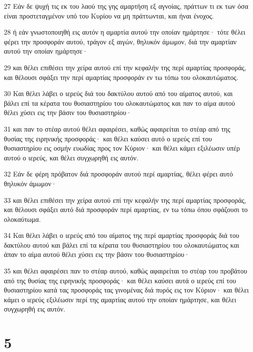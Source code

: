 \par 27 Εάν δε ψυχή τις εκ του λαού της γης αμαρτήση εξ αγνοίας, πράττων τι εκ των όσα είναι προστεταγμένον υπό του Κυρίου να μη πράττωνται, και ήναι ένοχος.
\par 28 ή εάν γνωστοποιηθή εις αυτόν η αμαρτία αυτού την οποίαν ημάρτησε· τότε θέλει φέρει την προσφοράν αυτού, τράγον εξ αιγών, θηλυκόν άμωμον, διά την αμαρτίαν αυτού την οποίαν ημάρτησε·
\par 29 και θέλει επιθέσει την χείρα αυτού επί την κεφαλήν της περί αμαρτίας προσφοράς, και θέλουσι σφάξει την περί αμαρτίας προσφοράν εν τω τόπω του ολοκαυτώματος.
\par 30 Και θέλει λάβει ο ιερεύς διά του δακτύλου αυτού από του αίματος αυτού, και βάλει επί τα κέρατα του θυσιαστηρίου του ολοκαυτώματος και παν το αίμα αυτού θέλει χύσει εις την βάσιν του θυσιαστηρίου·
\par 31 και παν το στέαρ αυτού θέλει αφαιρέσει, καθώς αφαιρείται το στέαρ από της θυσίας της ειρηνικής προσφοράς· και θέλει καύσει αυτό ο ιερεύς επί του θυσιαστηρίου εις οσμήν ευωδίας προς τον Κύριον· και θέλει κάμει εξιλέωσιν υπέρ αυτού ο ιερεύς, και θέλει συγχωρηθή εις αυτόν.
\par 32 Εάν δε φέρη πρόβατον διά προσφοράν αυτού περί αμαρτίας, θέλει φέρει αυτό θηλυκόν άμωμον·
\par 33 και θέλει επιθέσει την χείρα αυτού επί την κεφαλήν της περί αμαρτίας προσφοράς, και θέλουσι σφάξει αυτό διά προσφοράν περί αμαρτίας, εν τω τόπω όπου σφάζουσι το ολοκαύτωμα.
\par 34 Και θέλει λάβει ο ιερεύς από του αίματος της περί αμαρτίας προσφοράς διά του δακτύλου αυτού και βάλει επί τα κέρατα του θυσιαστηρίου του ολοκαυτώματος και άπαν το αίμα αυτού θέλει χύσει εις την βάσιν του θυσιαστηρίου·
\par 35 και θέλει αφαιρέσει παν το στέαρ αυτού, καθώς αφαιρείται το στέαρ του προβάτου από της θυσίας της ειρηνικής προσφοράς· και θέλει καύσει αυτά ο ιερεύς επί του θυσιαστηρίου κατά τας προσφοράς τας γινομένας διά πυρός εις τον Κύριον· και θέλει κάμει ο ιερεύς εξιλέωσιν περί της αμαρτίας αυτού την οποίαν ημάρτησε, και θέλει συγχωρηθή εις αυτόν.

\chapter{5}

